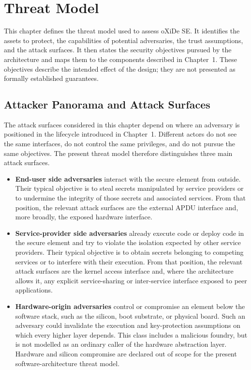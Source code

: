 \chapter{Threat Model}

This chapter defines the threat model used to assess oXiDe SE. It identifies
the assets to protect, the capabilities of potential adversaries, the trust
assumptions, and the attack surfaces. It then states the security objectives
pursued by the architecture and maps them to the components described in
Chapter~1. These objectives describe the intended effect of the design; they
are not presented as formally established guarantees.

\section{Attacker Panorama and Attack Surfaces}

The attack surfaces considered in this chapter depend on where an adversary is
positioned in the lifecycle introduced in Chapter~1. Different actors do not
see the same interfaces, do not control the same privileges, and do not pursue
the same objectives. The present threat model therefore distinguishes three
main attack surfaces.

\begin{itemize}
\item \textbf{End-user side adversaries} interact with the secure element from
  outside. Their typical objective is to steal secrets manipulated by service
  providers or to undermine the integrity of those secrets and associated
  services. From that position, the relevant attack surfaces are the external
  APDU interface and, more broadly, the exposed hardware interface.
\item \textbf{Service-provider side adversaries} already execute code or deploy
  code in the secure element and try to violate the isolation expected by other
  service providers. Their typical objective is to obtain secrets belonging to
  competing services or to interfere with their execution. From that position,
  the relevant attack surfaces are the kernel access interface and, where the
  architecture allows it, any explicit service-sharing or inter-service
  interface exposed to peer applications.
\item \textbf{Hardware-origin adversaries} control or compromise an element
  below the software stack, such as the silicon, boot substrate, or physical
  board. Such an adversary could invalidate the execution and key-protection
  assumptions on which every higher layer depends. This class includes a
  malicious foundry, but is not modelled as an ordinary caller of the hardware
  abstraction layer. Hardware and silicon compromise are declared out of scope
  for the present software-architecture threat model.
\end{itemize}

